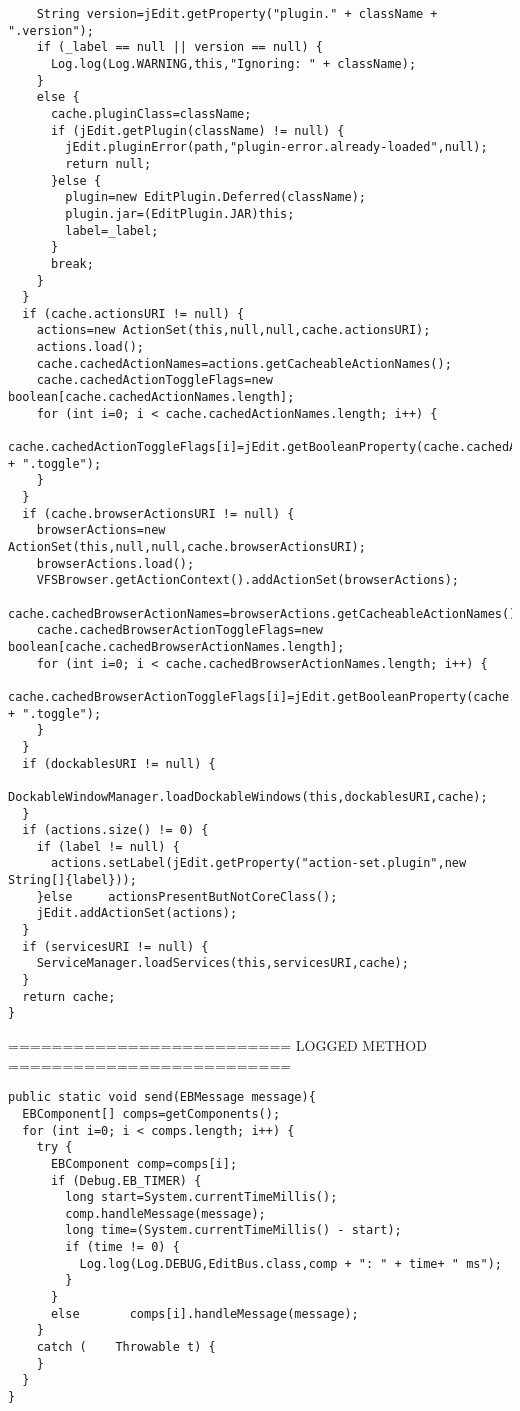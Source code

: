 \begin{lstlisting}
    String version=jEdit.getProperty("plugin." + className + ".version");
    if (_label == null || version == null) {
      Log.log(Log.WARNING,this,"Ignoring: " + className);
    }
    else {
      cache.pluginClass=className;
      if (jEdit.getPlugin(className) != null) {
        jEdit.pluginError(path,"plugin-error.already-loaded",null);
        return null;
      }else {
        plugin=new EditPlugin.Deferred(className);
        plugin.jar=(EditPlugin.JAR)this;
        label=_label;
      }
      break;
    }
  }
  if (cache.actionsURI != null) {
    actions=new ActionSet(this,null,null,cache.actionsURI);
    actions.load();
    cache.cachedActionNames=actions.getCacheableActionNames();
    cache.cachedActionToggleFlags=new boolean[cache.cachedActionNames.length];
    for (int i=0; i < cache.cachedActionNames.length; i++) {
      cache.cachedActionToggleFlags[i]=jEdit.getBooleanProperty(cache.cachedActionNames[i] + ".toggle");
    }
  }
  if (cache.browserActionsURI != null) {
    browserActions=new ActionSet(this,null,null,cache.browserActionsURI);
    browserActions.load();
    VFSBrowser.getActionContext().addActionSet(browserActions);
    cache.cachedBrowserActionNames=browserActions.getCacheableActionNames();
    cache.cachedBrowserActionToggleFlags=new boolean[cache.cachedBrowserActionNames.length];
    for (int i=0; i < cache.cachedBrowserActionNames.length; i++) {
      cache.cachedBrowserActionToggleFlags[i]=jEdit.getBooleanProperty(cache.cachedBrowserActionNames[i] + ".toggle");
    }
  }
  if (dockablesURI != null) {
    DockableWindowManager.loadDockableWindows(this,dockablesURI,cache);
  }
  if (actions.size() != 0) {
    if (label != null) {
      actions.setLabel(jEdit.getProperty("action-set.plugin",new String[]{label}));
    }else     actionsPresentButNotCoreClass();
    jEdit.addActionSet(actions);
  }
  if (servicesURI != null) {
    ServiceManager.loadServices(this,servicesURI,cache);
  }
  return cache;
}

\end{lstlisting}
========================== LOGGED METHOD ==========================
\begin{lstlisting}
public static void send(EBMessage message){
  EBComponent[] comps=getComponents();
  for (int i=0; i < comps.length; i++) {
    try {
      EBComponent comp=comps[i];
      if (Debug.EB_TIMER) {
        long start=System.currentTimeMillis();
        comp.handleMessage(message);
        long time=(System.currentTimeMillis() - start);
        if (time != 0) {
          Log.log(Log.DEBUG,EditBus.class,comp + ": " + time+ " ms");
        }
      }
      else       comps[i].handleMessage(message);
    }
    catch (    Throwable t) {
    }
  }
}
\end{lstlisting}
